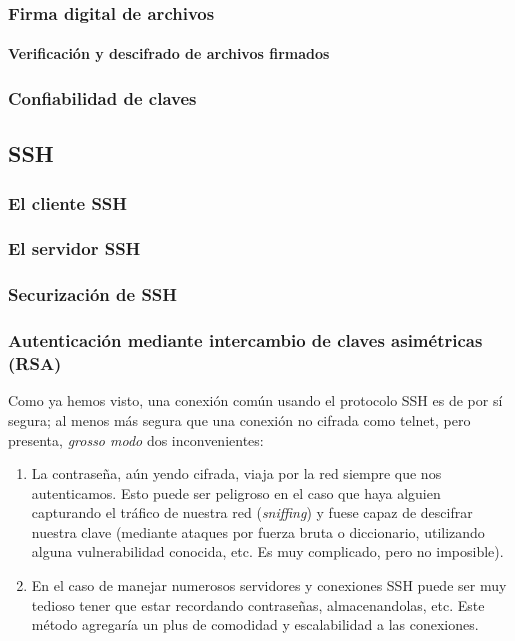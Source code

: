\documentclass[a4paper, 11pt, titlepage]{book}
\begin{document}
            \subsubsection{Firma digital de archivos}
    
                \paragraph{Verificación y descifrado de archivos firmados}
    
            \subsubsection{Confiabilidad de claves}
    
        \subsection{SSH}
    
            \subsubsection{El cliente SSH}
            \subsubsection{El servidor SSH}
            \subsubsection{Securización de SSH}
            \subsubsection{Autenticación mediante intercambio de claves asimétricas (RSA)}
    
                Como ya hemos visto, una conexión común usando el protocolo SSH es de por sí 
                segura; al menos más segura que una conexión no cifrada como telnet, pero presenta,
                \textit{grosso modo} dos inconvenientes:
    
                \begin{enumerate}
                    \item La contraseña, aún yendo cifrada, viaja por la red siempre que nos autenticamos.
                    Esto puede ser peligroso en el caso que haya alguien capturando el tráfico de nuestra 
                    red (\textit{sniffing}) y fuese capaz de descifrar nuestra clave (mediante ataques por 
                    fuerza bruta o diccionario, utilizando alguna vulnerabilidad conocida, etc. Es muy 
                    complicado, pero no imposible).
                    \item En el caso de manejar numerosos servidores y conexiones SSH puede ser muy tedioso 
                    tener que estar recordando contraseñas, almacenandolas, etc. Este método agregaría un plus 
                    de comodidad y escalabilidad a las conexiones.
                \end{enumerate}
    
\end{document}
